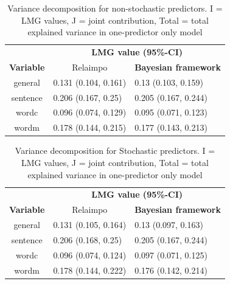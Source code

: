 \documentclass[11pt,a4paper,twoside]{book}\usepackage[]{graphicx}\usepackage[]{color}
\begin{document}
\begin{table}[h]
\caption{Variance decomposition for non-stochastic predictors. I = LMG values, J = joint contribution, Total = total explained variance in one-predictor only model}
\centering
\begin{tabular}{cll}
   \toprule
   &\multicolumn{2}{c}{\textbf{LMG value (95\%-CI)}} \\
 \textbf{Variable} & \multicolumn{1}{c}{Relaimpo} & \textbf{Bayesian framework}  \\
  \hline
general & 0.131 (0.104, 0.161)  & 0.13 (0.103, 0.159)  \\ 
sentence & 0.206 (0.167, 0.25)  & 0.205 (0.167, 0.244)   \\ 
wordc & 0.096 (0.074, 0.129)  & 0.095 (0.071, 0.123)  \\ 
wordm & 0.178 (0.144, 0.215) & 0.177 (0.143, 0.213)  \\ 
   \bottomrule
\end{tabular}
\label{tbl:empirical.relaimp.comp}
\end{table}





\begin{table}[h]
\caption{Variance decomposition for Stochastic predictors. I = LMG values, J = joint contribution, Total = total explained variance in one-predictor only model}
\centering
\begin{tabular}{cll}
   \toprule
   &\multicolumn{2}{c}{\textbf{LMG value (95\%-CI)}} \\
 \textbf{Variable} & \multicolumn{1}{c}{Relaimpo} & \textbf{Bayesian framework}  \\
  \hline
general & 0.131 (0.105, 0.164)  &  0.13 (0.097, 0.163)  \\ 
sentence & 0.206 (0.168, 0.25)  &  0.205 (0.167, 0.244)   \\ 
wordc & 0.096 (0.074, 0.124)  &  0.097 (0.071, 0.125)  \\ 
wordm & 0.178 (0.144, 0.222) &  0.176 (0.142, 0.214) \\ 
   \bottomrule
\end{tabular}
\label{tbl:empirical.relaimp.comp.stoch}
\end{table}






\end{document}
